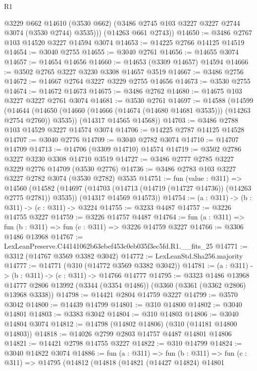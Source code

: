 \begin{lexlean}{R1}
\begin{coremodule}
          @3229
          @662
          @14610
          (@3530 @662)
          (@3486 @2745 @103 @3227 @3227 @2744 @3074 (@3530 @2744) @3535)))
      (@14263 @661 @2743))
@14650 := @3486 @2767 @103 @14520 @3227 @14594 @3074
@14653 := @14225 @2766 @14125 @14519
@14654 := @3040 @2755
@14655 := @3040 @2761
@14656 := @14655 @3074
@14657 := @14654 @14656
@14660 := @14653 (@3309 @14657) @14594
@14666 := @3502 @2765 @3227 @3230 @3308 @14657 @3519
@14667 := @3486 @2756
@14672 := @14667 @2764 @3227 @3229 @2755 @14656
@14673 := @3530 @2755
@14674 := @14672 @14673
@14675 := @3486 @2762
@14680 := @14675 @103 @3227 @3227 @2761 @3074
@14681 := @3530 @2761
@14697 := @14588
    (@14599
      (@14644 (@14650 (@14660 (@14666 (@14674 (@14680 @14681 @3535))) (@14263 @2754 @2760)) @3535))
      (@14317 @14565 @14568))
@14703 := @3486 @2788 @103 @14529 @3227 @14574 @3074
@14706 := @14225 @2787 @14125 @14528
@14707 := @3040 @2776
@14709 := @3040 @2782 @3074
@14710 := @14707 @14709
@14713 := @14706 (@3309 @14710) @14574
@14719 := @3502 @2786 @3227 @3230 @3308 @14710 @3519
@14727 := @3486 @2777 @2785 @3227 @3229 @2776 @14709 (@3530 @2776)
@14736 := @3486 @2783 @103 @3227 @3227 @2782 @3074 (@3530 @2782) @3535
@14751 := fun (value : @311) =>
  @14560
    (@14582
      (@14697 (@14703 (@14713 (@14719 (@14727 @14736)) (@14263 @2775 @2781)) @3535))
      (@14317 @14569 @14573))
@14754 := (a : @311) -> (b : @311) -> (c : @311) -> @3224
@14755 := @3233 @4487
@14757 := @3226 @14755 @3227
@14759 := @3226 @14757 @4487
@14764 := fun (a : @311) => fun (b : @311) => fun (c : @311) => @3226 @14759 @3227
@14766 := @3306 @1486 @13968
@14767 := LexLeanPreserve.C44141062b63ebef453c0eb035f3ec5fd.R1.__fits_25
@14771 := @3312 (@14767 @3569 @3382 @3042)
@14772 := LexLeanStd.Sha256.majority
@14777 := @14771 (@310 (@14772 @3569 @3382 @3042))
@14781 := (a : @311) -> (b : @311) -> (c : @311) -> @14766 @14777
@14795 := @3323
    @1486
    @13968
    @14777
    @2806
    @13992
    (@3344 (@3354 @1486))
    (@3360 (@3361 (@3362 @2806) @13968 @3338))
@14798 := @14421 @2804 @14759 @3227
@14799 := @3570 @3042
@14800 := @14439 @14799
@14801 := @310 @14800
@14802 := @3040 @14801
@14803 := @3383 @3042
@14804 := @310 @14803
@14806 := @3040 @14804 @3074
@14812 := @14798 (@14802 @14806) (@310 (@14181 @14800 @14803))
@14818 := @14026 @2799 @2803 @14757 @4487 @14801 @14806
@14821 := @14421 @2798 @14755 @3227
@14822 := @310 @14799
@14824 := @3040 @14822 @3074
@14886 := fun (a : @311) =>
  fun (b : @311) =>
  fun (c : @311) =>
  @14795
    (@14812
      (@14818
        (@14821
          (@14427 @14824)
          @14801

\end{coremodule}
\end{lexlean}
